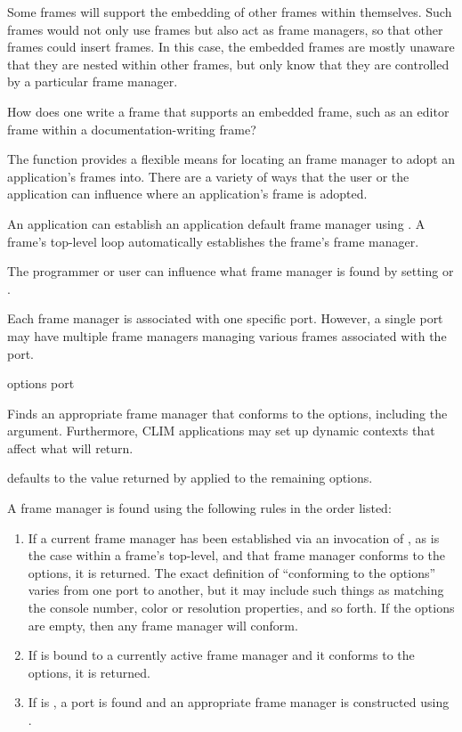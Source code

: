 Some frames will support the embedding of other frames within themselves.  Such
frames would not only use frames but also act as frame managers, so that other
frames could insert frames.  In this case, the embedded frames are mostly
unaware that they are nested within other frames, but only know that they are
controlled by a particular frame manager.  

 {How does one write a frame that supports an embedded frame, such
as an editor frame within a documentation-writing frame?}

The  function provides a flexible means for locating an
frame manager to adopt an application's frames into.  There are a variety of
ways that the user or the application can influence where an application's frame
is adopted.

An application can establish an application default frame manager using
.  A frame's top-level loop automatically establishes the
frame's frame manager.

The programmer or user can influence what frame manager is found by setting
 or .

Each frame manager is associated with one specific port.  However, a single port
may have multiple frame managers managing various frames associated with the
port.


 {\rest options \key port \allow}

Finds an appropriate frame manager that conforms to the options, including the
 argument.  Furthermore, CLIM applications may set up dynamic contexts
that affect what  will return.

 defaults to the value returned by  applied to the remaining options.

A frame manager is found using the following rules in the order listed:

\begin{enumerate}
\item If a current frame manager has been established via an invocation of
, as is the case within a frame's top-level, and that
frame manager conforms to the options, it is returned.  The exact definition of
``conforming to the options'' varies from one port to another, but it may
include such things as matching the console number, color or resolution
properties, and so forth.  If the options are empty, then any frame manager will
conform.

\item If  is bound to a currently active frame
manager and it conforms to the options, it is returned.

\item If  is , a port is found and an appropriate
frame manager is constructed using .
\end{enumerate}


